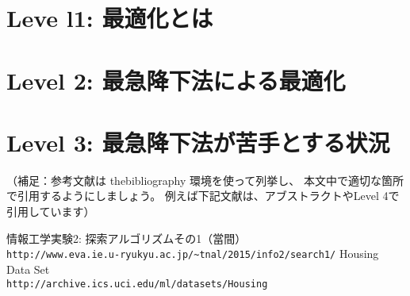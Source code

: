 \documentclass[10pt]{jarticle}
\begin{document}
\newpage

\section{Leve l1: 最適化とは}




\newpage

\section{Level 2: 最急降下法による最適化}




\newpage

\section{Level 3: 最急降下法が苦手とする状況}

\vspace{+1.0cm}
（補足：参考文献は thebibliography 環境を使って列挙し、
本文中で適切な箇所で引用するようにしましょう。
例えば下記文献は、アブストラクトやLevel 4で引用しています）
\begin{thebibliography}{99}
情報工学実験2: 探索アルゴリズムその1（當間）\\
\verb|http://www.eva.ie.u-ryukyu.ac.jp/~tnal/2015/info2/search1/|
Housing Data Set\\
\verb|http://archive.ics.uci.edu/ml/datasets/Housing|
\end{thebibliography}
\end{document}

